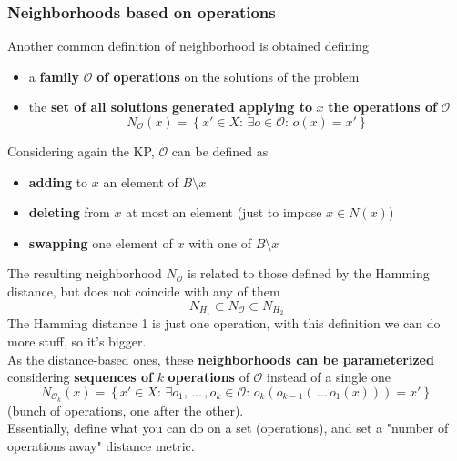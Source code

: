 \newpage

\subsubsection{Neighborhoods based on operations}

Another common definition of neighborhood is obtained defining
\begin{itemize}
	\item a \textbf{family} $\mathcal{O}$ \textbf{of operations} on the solutions of the problem
	
	\item the \textbf{set of all solutions generated applying to} $x$ \textbf{the operations of} $\mathcal{O}$
	$$ N_{\mathcal{O}} (x) = \left\{x' \in X : \, \exists o \in \mathcal{O}: \, o (x) = x' \right\} $$
\end{itemize}

Considering again the KP, $\mathcal{O}$ can be defined as
\begin{itemize}
	\item \textbf{adding} to $x$ an element of $B \setminus x$
	
	\item \textbf{deleting} from $x$ at most an element (just to impose $x \in N (x)$)
	
	\item \textbf{swapping} one element of $x$ with one of $B \setminus x$
\end{itemize}

The resulting neighborhood $N_{\mathcal{O}}$ is related to those defined by the Hamming distance, but does not coincide with any of them
$$ N_{H_1} \subset N_{\mathcal{O}} \subset N_{H_2} $$
The Hamming distance 1 is just one operation, with this definition we can do more stuff, so it's bigger.\\

As the distance-based ones, these \textbf{neighborhoods can be parameterized} considering \textbf{sequences of} $k$ \textbf{operations} of $\mathcal{O}$ instead of a single one
$$ N_{\mathcal{O}_k} (x) = \left\{ x' \in X : \, \exists o_1, \, ... \, , o_k \in \mathcal{O} : \, o_k (o_{k-1} ( \, ... \, o_1 (x))) = x' \right\} $$ 
(bunch of operations, one after the other).\\

Essentially, define what you can do on a set (operations), and set a "number of operations away" distance metric.\\	

